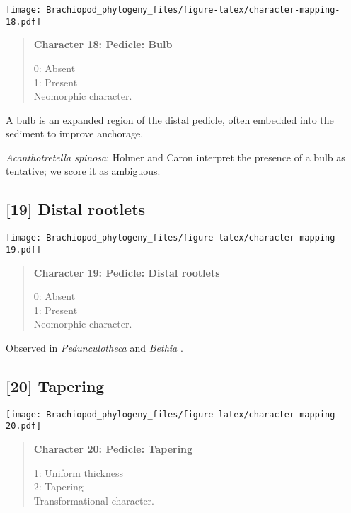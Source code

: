 \documentclass[openany]{book}
\theoremstyle{definition}
\theoremstyle{definition}
\theoremstyle{definition}
\theoremstyle{remark}
\begin{document}
\texttt{[image: Brachiopod\_phylogeny\_files/figure-latex/character-mapping-18.pdf]}

\begin{quote}
\textbf{Character 18: Pedicle: Bulb}

0: Absent\\
1: Present\\
Neomorphic character.
\end{quote}

A bulb is an expanded region of the distal pedicle, often embedded into
the sediment to improve anchorage.

\hypertarget{Acanthotretella_spinosa-coding-18}{}
\emph{Acanthotretella spinosa}: Holmer and Caron
\citeyearpar{Holmer2006Aspinose} interpret the presence of a bulb as
tentative; we score it as ambiguous.

\subsection*{{[}19{]} Distal rootlets}\label{distal-rootlets}

\texttt{[image: Brachiopod\_phylogeny\_files/figure-latex/character-mapping-19.pdf]}

\begin{quote}
\textbf{Character 19: Pedicle: Distal rootlets}

0: Absent\\
1: Present\\
Neomorphic character.
\end{quote}

Observed in \emph{Pedunculotheca} and \emph{Bethia}
\citep{Sutton2005Silurianbrachiopods}.

\subsection*{{[}20{]} Tapering}\label{tapering}

\texttt{[image: Brachiopod\_phylogeny\_files/figure-latex/character-mapping-20.pdf]}

\begin{quote}
\textbf{Character 20: Pedicle: Tapering}

1: Uniform thickness\\
2: Tapering\\
Transformational character.
\end{quote}
\end{document}

